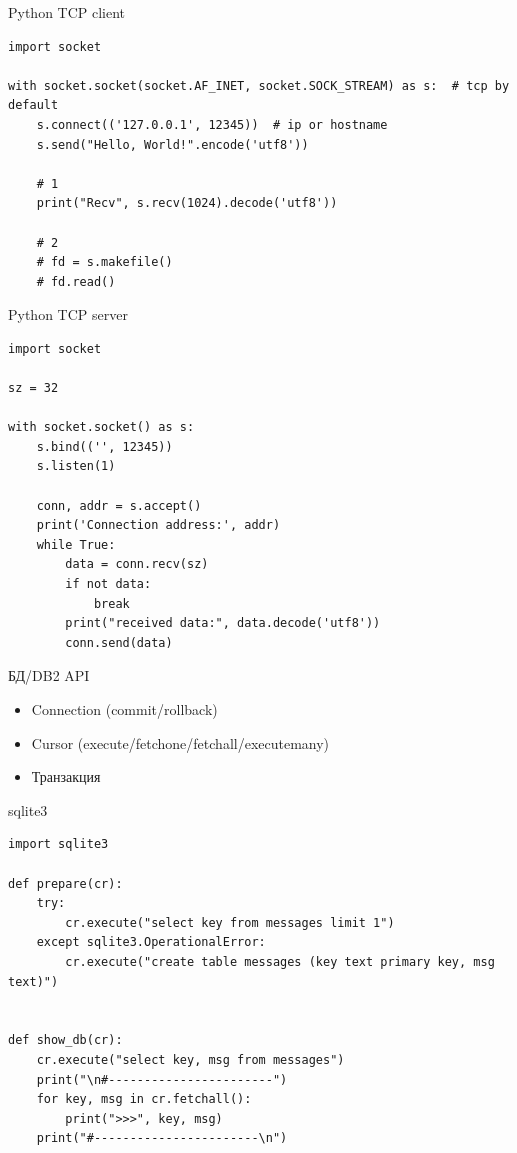 \documentclass{article}
\begin{document}
\begin{center} Python TCP client \end{center}
\begin{lstlisting}
import socket

with socket.socket(socket.AF_INET, socket.SOCK_STREAM) as s:  # tcp by default
    s.connect(('127.0.0.1', 12345))  # ip or hostname
    s.send("Hello, World!".encode('utf8'))

    # 1
    print("Recv", s.recv(1024).decode('utf8'))

    # 2
    # fd = s.makefile()
    # fd.read()
\end{lstlisting}
\newpage


\begin{center} Python TCP server \end{center}
\begin{lstlisting}
import socket

sz = 32

with socket.socket() as s:
    s.bind(('', 12345))
    s.listen(1)

    conn, addr = s.accept()
    print('Connection address:', addr)
    while True:
        data = conn.recv(sz)
        if not data:
            break
        print("received data:", data.decode('utf8'))
        conn.send(data)
\end{lstlisting}
\newpage

\begin{center} БД/DB2 API \end{center}
\begin{itemize}
    \item Connection (commit/rollback)
    \item Cursor (execute/fetchone/fetchall/executemany)
    \item Транзакция
\end{itemize}
\newpage

\begin{center} sqlite3 \end{center}
\begin{lstlisting}
import sqlite3

def prepare(cr):
    try:
        cr.execute("select key from messages limit 1")
    except sqlite3.OperationalError:
        cr.execute("create table messages (key text primary key, msg text)")


def show_db(cr):
    cr.execute("select key, msg from messages")
    print("\n#-----------------------")
    for key, msg in cr.fetchall():
        print(">>>", key, msg)
    print("#-----------------------\n")
\end{lstlisting}
\newpage
\end{document}
